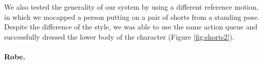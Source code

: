 We also tested the generality of our system by using a different reference motion, in which we mocapped a person putting on a pair of shorts from a standing pose. Despite the difference of the style, we was able to use the same action queue and successfully dressed the lower body of the character (Figure \ref{fig:shorts2}).

\paragraph{Robe.}







